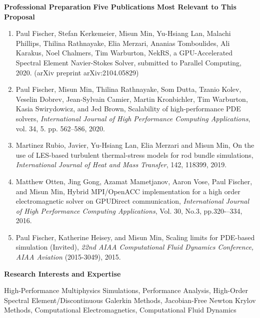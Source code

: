 \documentclass[11pt,letterpaper,english]{article}
\begin{document}
\begin{flushleft} {\bf Professional Preparation}
\vspace{.04in}
{\bf Five Publications Most Relevant to This Proposal}
\vspace{-6pt}
\begin{enumerate} \itemsep1pt \parskip0pt 
\item
  Paul Fischer, Stefan Kerkemeier, Misun Min, Yu-Hsiang Lan, Malachi Phillips, Thilina Rathnayake, Elia Merzari, 
  Ananias Tomboulides, Ali Karakus, Noel Chalmers, Tim Warburton,
  NekRS, a GPU-Accelerated Spectral Element Navier-Stokes Solver,
  submitted to Parallel Computing, 2020. (arXiv preprint arXiv:2104.05829)\\
\item Paul Fischer, Misun Min, Thilina Rathnayake, Som Dutta, Tzanio Kolev, Veselin
  Dobrev, Jean-Sylvain Camier, Martin Kronbichler, Tim Warburton, Kasia
  Swirydowicz, and Jed Brown, Scalability of high-performance PDE solvers,
  \textit{International Journal of High Performance Computing Applications}, vol. 34, 5. pp. 562--586, 2020. \\
\item Martinez Rubio, Javier, Yu-Hsiang Lan, Elia Merzari and Misun Min,
On the use of LES-based turbulent thermal-stress models for rod bundle simulations,
\textit{International Journal of Heat and Mass Transfer}, 142, 118399, 2019. \\
\item Matthew Otten, Jing Gong, Azamat Mametjanov, Aaron Vose, Paul Fischer, and Misun Min,
Hybrid MPI/OpenACC implementation for a high order electromagnetic solver on GPUDirect communication,
\textit{International Journal of High Performance Computing Applications}, Vol. 30, No.3, pp.320-–334, 2016.\\
\item Paul Fischer, Katherine Heisey, and Misun Min, Scaling limits for PDE-based simulation (Invited),
\textit{22nd AIAA Computational Fluid Dynamics Conference, AIAA Aviation} (2015-3049), 2015.
\end{enumerate}

\vspace{-6pt}
{\bf Research Interests and Expertise}
{\parindent 16pt

High-Performance Multiphysics Simulations,
Performance Analysis,
High-Order Spectral Element/Discontinuous Galerkin Methods,
Jacobian-Free Newton Krylov Methods,
Computational Electromagnetics, Computational Fluid Dynamics
}


\end{flushleft}
\end{document}
